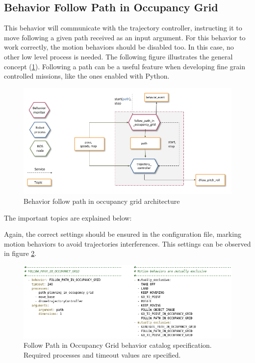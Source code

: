 \subsection{Behavior Follow Path in Occupancy Grid} \label{ch_4:subsect:behav_fpog}

  This behavior will communicate with the trajectory controller, instructing it to move following a given path received as an input argument. For this behavior to work correctly, the motion behaviors should be disabled too. In this case, no other low level process is needed. The following figure illustrates the general concept (\ref{ch_4:fig:behav_fp}). Following a path can be a useful feature when developing fine grain controlled missions, like the ones enabled with Python.

  \begin{figure}[h]
    \centering
    \includegraphics[width=\textwidth]{./Figures/BehaviorFPArquitecture.png}
    \caption{Behavior follow path in occupancy grid architecture}
    \label{ch_4:fig:behav_fp}
  \end{figure}

  The important topics are explained below:

  

  Again, the correct settings should be ensured in the configuration file, marking motion behaviors to avoid trajectories interferences. This settings can be observed in figure \ref{ch_4:fig:behav_fp_catalog}.

  \begin{figure}
    \centering
    \includegraphics[width=\textwidth]{./Figures/BehaviorFPCatalog.png}
    \caption{Follow Path in Occupancy Grid behavior catalog specification. Required processes and timeout values are specified.}
    \label{ch_4:fig:behav_fp_catalog}
  \end{figure}

